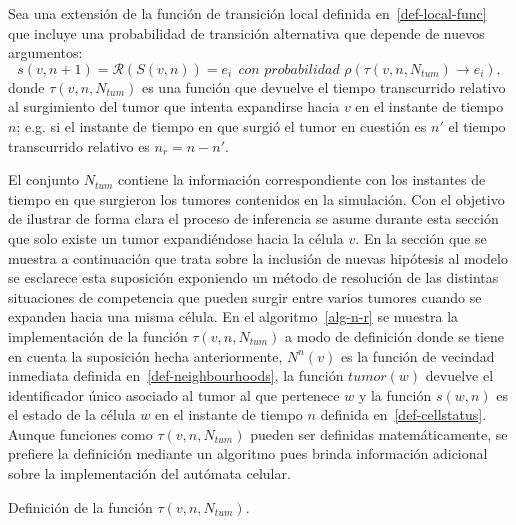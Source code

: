 \begin{definition}
\label{prop-newlocal-func}
Sea una extensi\'on de la funci\'on de transici\'on local definida en~\ref{def-local-func} que incluye una probabilidad de transici\'on alternativa que depende de nuevos argumentos:
\begin{equation}
s(v,n+1) = \mathcal{R}(S(v,n)) = e_i~~\textit{con probabilidad } \rho(\tau(v,n,N_{tum}) \rightarrow e_i), \label{eq-newlocal-func}
\end{equation}
donde $\tau(v,n,N_{tum})$ es una funci\'on que devuelve el tiempo transcurrido relativo al surgimiento del tumor que intenta expandirse hacia $v$ en el instante de tiempo $n$; e.g. si el instante de tiempo en que surgi\'o el tumor en cuesti\'on es $n'$ el tiempo transcurrido relativo es $n_r = n - n'$. 
\end{definition}

El conjunto $N_{tum}$ contiene la informaci\'on correspondiente con los instantes de tiempo en que surgieron los tumores contenidos en la simulaci\'on. Con el objetivo de ilustrar de forma clara el proceso de inferencia se asume durante esta secci\'on que solo existe un tumor expandi\'endose hacia la c\'elula $v$. En la secci\'on que se muestra a continuaci\'on que trata sobre la inclusi\'on de nuevas hip\'otesis al modelo se esclarece esta suposici\'on exponiendo un m\'etodo de resoluci\'on de las distintas situaciones de competencia que pueden surgir entre varios tumores cuando se expanden hacia una misma c\'elula. En el algoritmo~\ref{alg-n-r} se muestra la implementaci\'on de la funci\'on $\tau(v,n,N_{tum})$ a modo de definici\'on donde se tiene en cuenta la suposici\'on hecha anteriormente, $N^n(v)$ es la funci\'on de vecindad inmediata definida en~\ref{def-neighbourhoods}, la funci\'on $tumor(w)$ devuelve el identificador \'unico asociado al tumor al que pertenece $w$ y la funci\'on $s(w,n)$ es el estado de la c\'elula $w$ en el instante de tiempo $n$ definida en~\ref{def-cellstatus}. Aunque funciones como $\tau(v,n,N_{tum})$ pueden ser definidas matem\'aticamente, se prefiere la definici\'on mediante un algoritmo pues brinda informaci\'on adicional sobre la implementaci\'on del aut\'omata celular.

\begin{algorithm}[!ht]
\caption{Definici\'on de la funci\'on $\tau(v,n,N_{tum})$.} \label{alg-n-r}
\end{algorithm}

